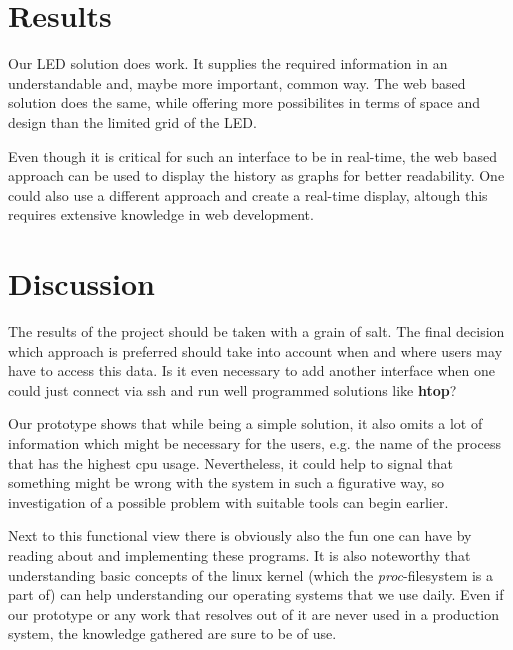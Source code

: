 \documentclass[twoside,twocolumn]{article}
\begin{document}
\section{Results}

Our LED solution does work. It supplies the required information in an
understandable and, maybe more important, common way. The web based solution
does the same, while offering more possibilites in terms of space and design 
than the limited grid of the LED.\@ 

Even though it is critical for such an interface to be in real-time, the web 
based approach can be used to display the history as graphs for better 
readability. One could also use a different approach and create a real-time 
display, altough this requires extensive knowledge in web development. 


\section{Discussion}

The results of the project should be taken with a grain of salt. The final
decision which approach is preferred should take into account when and where 
users may have to access this data. Is it even necessary to add another 
interface when one could just connect via ssh and run well programmed solutions 
like \textbf{htop}? 

Our prototype shows that while being a simple solution, it also omits a lot of
information which might be necessary for the users, e.g. the name of
the process that has the highest cpu usage. Nevertheless, it could help to 
signal that something might be wrong with the system in such a figurative way, 
so investigation of a possible problem with suitable tools can begin earlier. 

Next to this functional view there is obviously also the fun one can have by
reading about and implementing these programs. It is also noteworthy that
understanding basic concepts of the linux kernel (which the
\textit{proc}-filesystem is a part of) can help understanding our operating
systems that we use daily. Even if our prototype or any work that resolves out
of it are never used in a production system, the knowledge gathered are sure to
be of use. 

\end{document}
